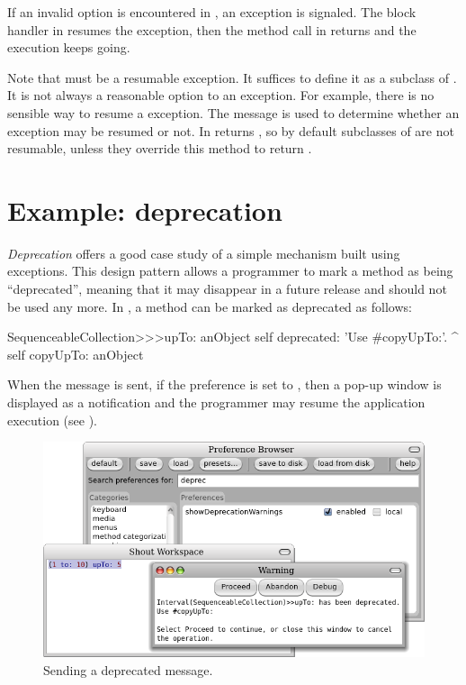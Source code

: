 \documentclass[a4paper,10pt,twoside]{book}
\begin{document}
If an invalid option is encountered in , an  exception is signaled. The block handler in  resumes the exception, then the  method call in  returns and the execution keeps going.

Note that  must be a resumable exception. It suffices to define it as a subclass of .
It is not always a reasonable option to  an exception. For example, there is no sensible way to resume a  exception. The message  is used to determine whether an exception may be resumed or not. In  returns , so by default subclasses of  are not resumable, unless they override this method to return .

\section{Example: deprecation}

\emph{Deprecation} offers a good case study of a simple mechanism built using exceptions.
This design pattern allows a programmer to mark a method as being ``deprecated'', meaning that it may disappear in a future release and should not be used any more. In \pharo, a method can be marked as deprecated as follows:

\begin{code}{}
SequenceableCollection>>>upTo: anObject
	self deprecated: 'Use #copyUpTo:'.
	^ self copyUpTo: anObject
\end{code}

When the message  is sent, if the  preference is set to , then a pop-up window is displayed as a notification and the programmer may resume the application execution (see ).


\begin{figure}[ht]\centering
        \includegraphics[width=.8\linewidth]{Deprecation}
        \caption{Sending a deprecated message.}
\end{figure}
\end{document}
